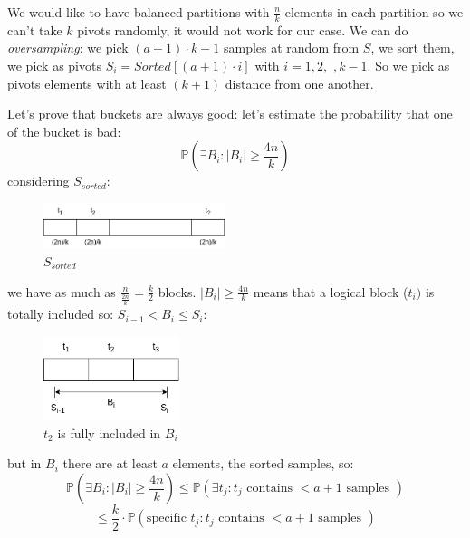 We would like to have balanced partitions with $\frac{n}{k}$ elements in each partition so we can't take $k$ pivots randomly, it would not work for our case. We can do \emph{oversampling}: we pick $(a+1) \cdot k - 1$ samples at random from $S$, we sort them, we pick as pivots $S_i = Sorted[(a+1) \cdot i]$ with $i = 1, 2, \_, k-1$. 
So we pick as pivots elements with at least $(k+1)$ distance from one another.

Let's prove that buckets are always good: let's estimate the probability that one of the bucket is bad:
$$
    \mathbb{P} \left( \exists B_i : |B_i| \geq \frac{4n}{k} \right)
$$
considering $S_{sorted}$:
\begin{figure}[H]
    \centering
    \includegraphics[width=200px]{images/2_Sorting/s_sorted.png}
    \caption{$S_{sorted}$}
\end{figure}
we have as much as $\frac{n}{ \frac{2n}{k} } = \frac{k}{2}$ blocks.
$|B_i| \geq \frac{4n}{k}$ means that a logical block ($t_i)$ is totally included so: $S_{i-1} < B_i \leq S_{i}$:
\begin{figure}[H]
    \centering
    \includegraphics[width=150px]{images/2_Sorting/included_block.png}
    \caption{$t_2$ is fully included in $B_i$}
\end{figure}
but in $B_i$ there are at least $a$ elements, the sorted samples, so:
$$
    \mathbb{P} \left( \exists B_i : |B_i| \geq \frac{4n}{k} \right) \leq \mathbb{P} (\exists t_j : t_j \text{ contains } < a+1 \text{ samples })
$$
$$
    \leq \frac{k}{2} \cdot \mathbb{P} (\text{specific } t_j : t_j \text{ contains } < a+1 \text{ samples })
$$


